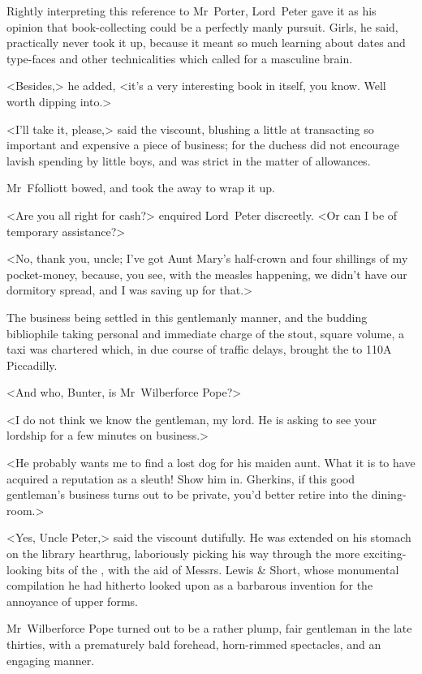 Rightly interpreting this reference to Mr~Porter, Lord~Peter gave it as his opinion that book-collecting could be a perfectly manly pursuit. Girls, he said, practically never took it up, because it meant so much learning about dates and type-faces and other technicalities which called for a masculine brain.

<Besides,> he added, <it's a very interesting book in itself, you know. Well worth dipping into.>

<I'll take it, please,> said the viscount, blushing a little at transacting so important and expensive a piece of business; for the duchess did not encourage lavish spending by little boys, and was strict in the matter of allowances.

Mr~Ffolliott bowed, and took the  away to wrap it up.

<Are you all right for cash?> enquired Lord~Peter discreetly. <Or can I be of temporary assistance?>

<No, thank you, uncle; I've got Aunt Mary's half-crown and four shillings of my pocket-money, because, you see, with the measles happening, we didn't have our dormitory spread, and I was saving up for that.>

The business being settled in this gentlemanly manner, and the budding bibliophile taking personal and immediate charge of the stout, square volume, a taxi was chartered which, in due course of traffic delays, brought the  to 110A Piccadilly.

\divider\pagebreak[2]

<And who, Bunter, is Mr~Wilberforce Pope?>

<I do not think we know the gentleman, my lord. He is asking to see your lordship for a few minutes on business.>

<He probably wants me to find a lost dog for his maiden aunt. What it is to have acquired a reputation as a sleuth! Show him in. Gherkins, if this good gentleman's business turns out to be private, you'd better retire into the dining-room.>

<Yes, Uncle Peter,> said the viscount dutifully. He was extended on his stomach on the library hearthrug, laboriously picking his way through the more exciting-looking bits of the , with the aid of Messrs. Lewis \& Short, whose monumental compilation he had hitherto looked upon as a barbarous invention for the annoyance of upper forms.

Mr~Wilberforce Pope turned out to be a rather plump, fair gentleman in the late thirties, with a prematurely bald forehead, horn-rimmed spectacles, and an engaging manner.

